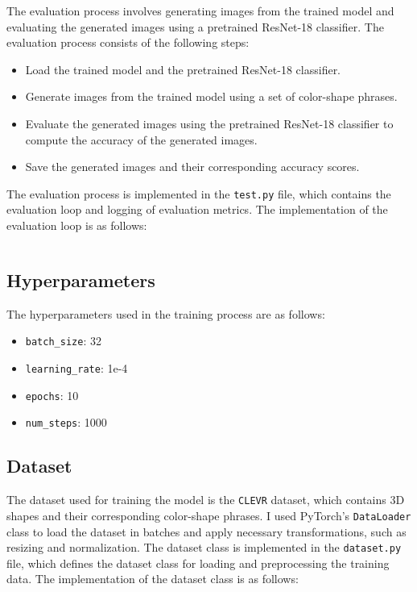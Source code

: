 The evaluation process involves generating images from the trained model and evaluating the generated images using a pretrained ResNet-18 classifier. The evaluation process consists of the following steps:
\begin{itemize}
    \item Load the trained model and the pretrained ResNet-18 classifier.
    \item Generate images from the trained model using a set of color-shape phrases.
    \item Evaluate the generated images using the pretrained ResNet-18 classifier to compute the accuracy of the generated images.
    \item Save the generated images and their corresponding accuracy scores.
\end{itemize}

The evaluation process is implemented in the \texttt{test.py} file, which contains the evaluation loop and logging of evaluation metrics. The implementation of the evaluation loop is as follows:
\inputminted[firstline=15,lastline=97,highlightlines={31,34,56-97}]{python}{../src/test.py}

\subsection{Hyperparameters}
\label{sec:hyperparameters}
The hyperparameters used in the training process are as follows:
\begin{itemize}
    \item \texttt{batch\_size}: 32
    \item \texttt{learning\_rate}: 1e-4
    \item \texttt{epochs}: 10
    \item \texttt{num\_steps}: 1000
\end{itemize}

\subsection{Dataset}
\label{sec:dataset}

The dataset used for training the model is the \texttt{CLEVR} dataset, which contains 3D shapes and their corresponding color-shape phrases.
I used PyTorch's \texttt{DataLoader} class to load the dataset in batches and apply necessary transformations, such as resizing and normalization.
The dataset class is implemented in the \texttt{dataset.py} file, which defines the dataset class for loading and preprocessing the training data. The implementation of the dataset class is as follows:
\inputminted[firstline=9, lastline=64]{python}{../src/dataset.py}
